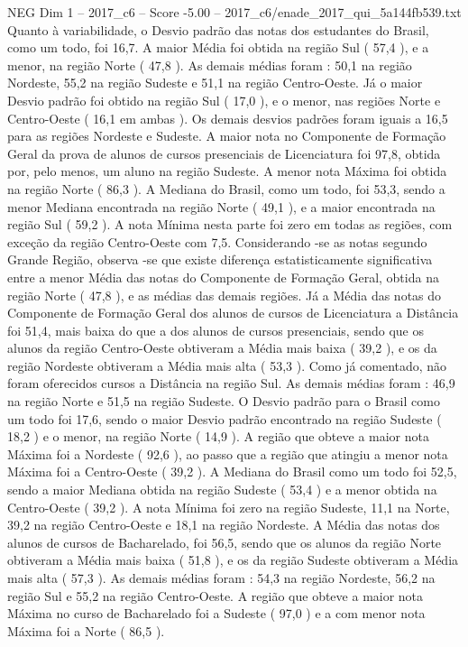 \begin{textsample}{NEG Dim 1 – 2017\_c6 – Score -5.00 – 2017\_c6/enade\_2017\_qui\_5a144fb539.txt}
Quanto à variabilidade, o Desvio padrão das notas dos estudantes do Brasil, como um todo, foi 16,7.
A maior Média foi obtida na região Sul ( 57,4 ), e a menor, na região Norte ( 47,8 ).
As demais médias foram : 50,1 na região Nordeste, 55,2 na região Sudeste e 51,1 na região Centro-Oeste.
Já o maior Desvio padrão foi obtido na região Sul ( 17,0 ), e o menor, nas regiões Norte e Centro-Oeste ( 16,1 em ambas ).
Os demais desvios padrões foram iguais a 16,5 para as regiões Nordeste e Sudeste.
A maior nota no Componente de Formação Geral da prova de alunos de cursos presenciais de Licenciatura foi 97,8, obtida por, pelo menos, um aluno na região Sudeste.
A menor nota Máxima foi obtida na região Norte ( 86,3 ).
A Mediana do Brasil, como um todo, foi 53,3, sendo a menor Mediana encontrada na região Norte ( 49,1 ), e a maior encontrada na região Sul ( 59,2 ).
A nota Mínima nesta parte foi zero em todas as regiões, com exceção da região Centro-Oeste com 7,5.
Considerando -se as notas segundo Grande Região, observa -se que existe diferença estatisticamente significativa entre a menor Média das notas do Componente de Formação Geral, obtida na região Norte ( 47,8 ), e as médias das demais regiões.
Já a Média das notas do Componente de Formação Geral dos alunos de cursos de Licenciatura a Distância foi 51,4, mais baixa do que a dos alunos de cursos presenciais, sendo que os alunos da região Centro-Oeste obtiveram a Média mais baixa ( 39,2 ), e os da região Nordeste obtiveram a Média mais alta ( 53,3 ).
Como já comentado, não foram oferecidos cursos a Distância na região Sul.
As demais médias foram : 46,9 na região Norte e 51,5 na região Sudeste.
O Desvio padrão para o Brasil como um todo foi 17,6, sendo o maior Desvio padrão encontrado na região Sudeste ( 18,2 ) e o menor, na região Norte ( 14,9 ).
A região que obteve a maior nota Máxima foi a Nordeste ( 92,6 ), ao passo que a região que atingiu a menor nota Máxima foi a Centro-Oeste ( 39,2 ).
A Mediana do Brasil como um todo foi 52,5, sendo a maior Mediana obtida na região Sudeste ( 53,4 ) e a menor obtida na Centro-Oeste ( 39,2 ).
A nota Mínima foi zero na região Sudeste, 11,1 na Norte, 39,2 na região Centro-Oeste e 18,1 na região Nordeste.
A Média das notas dos alunos de cursos de Bacharelado, foi 56,5, sendo que os alunos da região Norte obtiveram a Média mais baixa ( 51,8 ), e os da região Sudeste obtiveram a Média mais alta ( 57,3 ).
As demais médias foram : 54,3 na região Nordeste, 56,2 na região Sul e 55,2 na região Centro-Oeste.
A região que obteve a maior nota Máxima no curso de Bacharelado foi a Sudeste ( 97,0 ) e a com menor nota Máxima foi a Norte ( 86,5 ).

\end{textsample}
